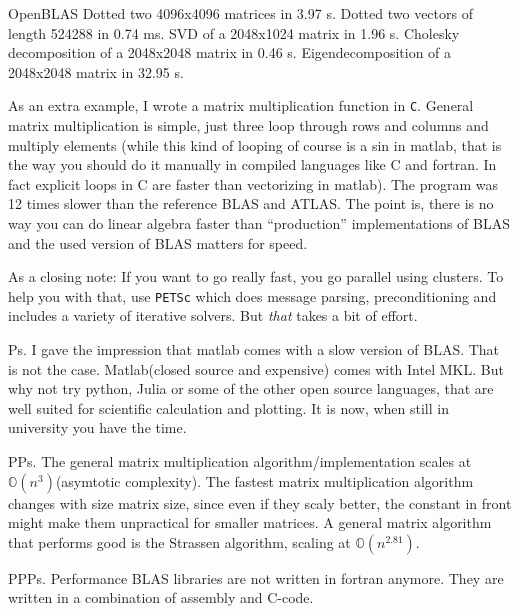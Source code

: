 OpenBLAS
Dotted two 4096x4096 matrices in 3.97 s.
Dotted two vectors of length 524288 in 0.74 ms.
SVD of a 2048x1024 matrix in 1.96 s.
Cholesky decomposition of a 2048x2048 matrix in 0.46 s.
Eigendecomposition of a 2048x2048 matrix in 32.95 s.

As an extra example, I wrote a matrix multiplication function in \texttt{C}.
General matrix multiplication is simple, just three loop through rows and
columns and multiply elements (while this kind of looping of course is a sin in
matlab, that is the way you should do it manually in compiled languages like C
and fortran. In fact explicit loops in C are faster than vectorizing in matlab).
The program was 12 times slower than the reference BLAS and ATLAS. The point is,
there is no way you can do linear algebra faster than ``production''
implementations of BLAS and the used version of BLAS matters for speed.

As a closing note: If you want to go really fast, you go parallel using
clusters. To help you with that, use \texttt{PETSc} which does message parsing,
preconditioning and includes a variety of iterative solvers. But \textit{that}
takes a bit of effort.

Ps.
I gave the impression that matlab comes with a slow version of BLAS. That is not
the case. Matlab(closed source and expensive) comes with Intel MKL. But why not
try python, Julia or some of the other open source languages, that are well
suited for scientific calculation and plotting. It is now, when still in
university you have the time.

PPs.
The general matrix multiplication algorithm/implementation scales at
$\mathbb{O}(n^3)$(asymtotic complexity). The fastest matrix multiplication
algorithm changes with size matrix size, since even if they scaly better, the
constant in front might make them unpractical for smaller matrices. A general
matrix algorithm that performs good is the Strassen algorithm, scaling at
$\mathbb{O}(n^{2.81})$.

PPPs.
Performance BLAS libraries are not written in fortran anymore. They are written
in a combination of assembly and C-code.


